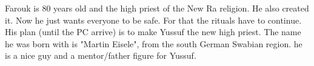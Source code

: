 \begin{npcBox}[title=Farouk]
    \begin{consequences}
    \item {}
    \item {}
    \item {}
    \end{consequences}

    \begin{npcDescription}
    Farouk is 80 years old and the high priest of the New Ra religion. He also created it. Now he just wants everyone to be safe. For that the rituals have to continue. His plan (until the PC arrive) is to make Yussuf the new high priest. The name he was born with is "Martin Eisele", from the south German Swabian region.
    he is a nice guy and a mentor/father figure for Yussuf.

    \end{npcDescription}

\end{npcBox}



